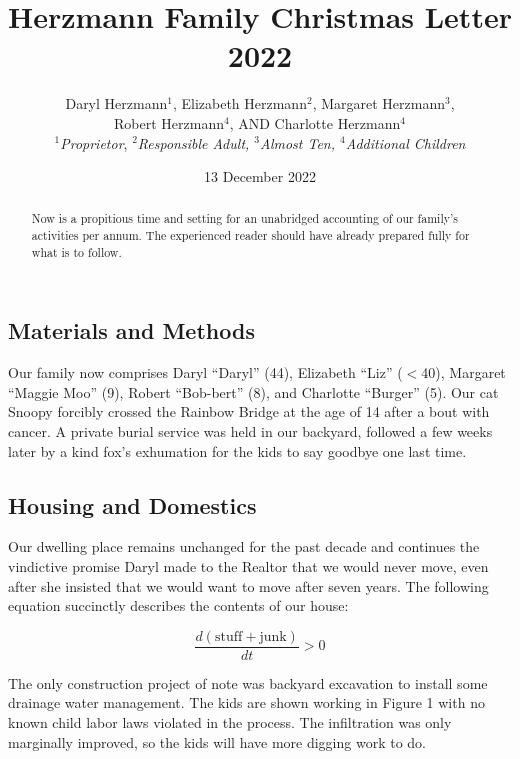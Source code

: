 \documentclass[letterpaper,11pt]{article}
\title{\vspace{-2.0cm}Herzmann Family Christmas Letter 2022}
\author{Daryl Herzmann${}^1$, Elizabeth Herzmann${}^2$, Margaret 
Herzmann${}^3$,\\
Robert Herzmann${}^4$, AND Charlotte Herzmann${}^4$ \\
\textit{${}^1$Proprietor},
\it{${}^2$Responsible Adult},
\it{${}^3$Almost Ten},
\it{${}^4$Additional Children}}
\date{13 December 2022}
\begin{document}
\maketitle
\vspace{-0.75cm}
\begin{abstract}
Now is a propitious time and setting for an unabridged accounting of our
family's activities per annum.  The experienced reader should have already
prepared fully for what is to follow.
\end{abstract}

\vspace{-0.5cm}

\noindent\makebox[\linewidth]{\rule{\textwidth}{1pt}}

\begin{multicols}{2}

\section{Materials and Methods} 

Our family now comprises Daryl
\enquote{Daryl} (44), Elizabeth \enquote{Liz} ($<$40),
Margaret \enquote{Maggie Moo} (9), Robert \enquote{Bob-bert} (8), and
Charlotte \enquote{Burger} (5). Our cat Snoopy forcibly crossed the Rainbow
Bridge at the age of 14 after a bout with cancer.  A private burial service
was held in our backyard, followed a few weeks later by a kind fox's
exhumation for the kids to say goodbye one last time.

\subsection{Housing and Domestics}

Our dwelling place remains unchanged for the past decade and continues the
vindictive promise Daryl made to the Realtor that we would never move, even after she
insisted that we would want to move after seven years.  The following equation
succinctly describes the contents of our house:

\[ \frac{d(\mathrm{stuff} + \mathrm{junk})}{dt} > 0 \]

The only construction project of note was backyard excavation to install some
drainage water management.  The kids are shown working in Figure 1 with no
known child labor laws violated in the process.  The infiltration was only
marginally improved, so the kids will have more digging work to do.

\bigskip


\end{multicols}
\end{document}
